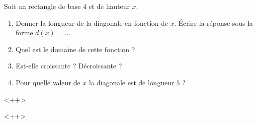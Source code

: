 
\begin{exercice}\label{exoSeconde-0076}

Soit un rectangle de base \( 4\) et de hauteur \( x\).
\begin{multicols}{2}
    \begin{enumerate}
        \item
            Donner la longueur de la diagonale en fonction de \( x\). Écrire la réponse sous la forme \( d(x)=\ldots\)
        \item
            Quel est le domaine de cette fonction ?
        \item
            Est-elle croissante ? Décroissante ?
        \item
            Pour quelle valeur de \( x\) la diagonale est de longueur \( 5\) ?
    \end{enumerate}<++>
\end{multicols}
<++>



\end{exercice}
